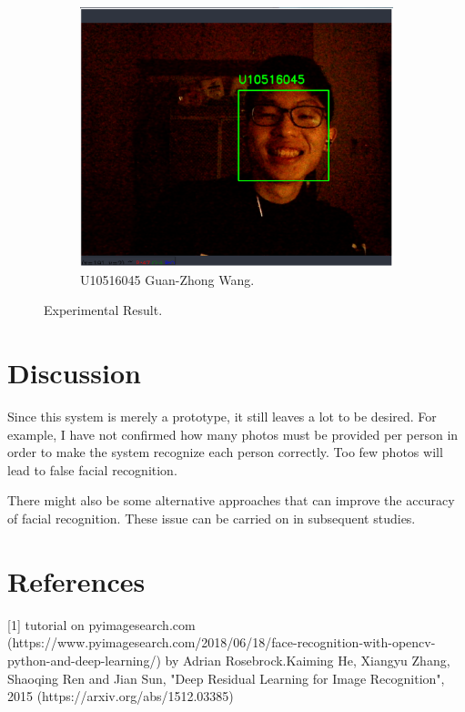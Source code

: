 \documentclass[14pt]{report}
\begin{document}
\begin{figure}[h!]
\begin{subfigure}[b]{0.32\linewidth}
    \includegraphics[width=\linewidth]{figures/exp45.eps}
    \caption{U10516045 Guan-Zhong Wang.}
  \end{subfigure}
  \caption{Experimental Result.}
  \label{fig:coffee}
\end{figure}


\section{Discussion}
Since this system is merely a prototype, it still leaves a lot to be desired. For example, I have
not confirmed how many photos must be provided per person in order to make the system recognize each person
correctly. Too few photos will lead to false facial recognition.
\newline

There might also be some alternative approaches that can improve the accuracy of facial recognition. These
issue can be carried on in subsequent studies.


\section{References}
[1] tutorial on pyimagesearch.com (https://www.pyimagesearch.com/2018/06/18/face-recognition-with-opencv-python-and-deep-learning/) by Adrian Rosebrock.\newline\newline
[2] Kaiming He, Xiangyu Zhang, Shaoqing Ren and Jian Sun, "Deep Residual Learning for Image Recognition", 2015 (https://arxiv.org/abs/1512.03385)
\end{document}
